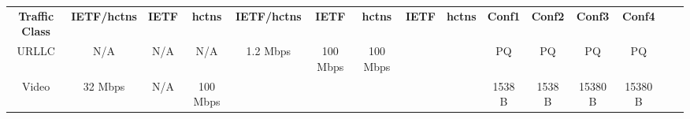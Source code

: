 \begin{table*}
{\begin{tabular}{cclccclccccccccll}
\multicolumn{1}{|c|}{\multirow{-3}{*}{\cellcolor[HTML]{FFFFFF}\textbf{Traffic Class}}} & \multicolumn{2}{c|}{\cellcolor[HTML]{FFFFFF}\textbf{IETF/\gls{hctns}}} & \multicolumn{1}{c|}{\cellcolor[HTML]{FFFFFF}\textbf{IETF}} & \multicolumn{1}{c|}{\cellcolor[HTML]{FFFFFF}\textbf{\gls{hctns}}} & \multicolumn{2}{c|}{\cellcolor[HTML]{FFFFFF}\textbf{IETF/\gls{hctns}}}      & \multicolumn{1}{c|}{\cellcolor[HTML]{FFFFFF}\textbf{IETF}}              & \multicolumn{1}{c|}{\cellcolor[HTML]{FFFFFF}\textbf{\gls{hctns}}}          & \multicolumn{1}{c|}{\cellcolor[HTML]{FFFFFF}\textbf{IETF}}         & \multicolumn{1}{c|}{\cellcolor[HTML]{FFFFFF}\textbf{\gls{hctns}}}          & \multicolumn{1}{c|}{\cellcolor[HTML]{FFFFFF}\textbf{Conf1}}          & \multicolumn{1}{c|}{\cellcolor[HTML]{FFFFFF}\textbf{Conf2}}           & \multicolumn{1}{c|}{\cellcolor[HTML]{FFFFFF}\textbf{Conf3}}          & \multicolumn{1}{c|}{\cellcolor[HTML]{FFFFFF}\textbf{Conf4}}           &  &  \\ \cline{1-15}
\multicolumn{1}{|c|}{\cellcolor[HTML]{FFFFFF}URLLC}                                    & \multicolumn{2}{c|}{\cellcolor[HTML]{FFFFFF}N/A}                    & \multicolumn{1}{c|}{\cellcolor[HTML]{FFFFFF}N/A}           & \multicolumn{1}{c|}{\cellcolor[HTML]{FFFFFF}N/A}               & \multicolumn{2}{c|}{\cellcolor[HTML]{FFFFFF}1.2 Mbps}                    & \multicolumn{1}{c|}{\cellcolor[HTML]{FFFFFF}100 Mbps}                   & \multicolumn{1}{c|}{\cellcolor[HTML]{FFFFFF}100 Mbps}                   & \multicolumn{1}{c|}{\cellcolor[HTML]{FFFFFF}}                      & \multicolumn{1}{c|}{\cellcolor[HTML]{FFFFFF}}                           & \multicolumn{1}{c|}{\cellcolor[HTML]{FFFFFF}PQ}                     & \multicolumn{1}{c|}{\cellcolor[HTML]{FFFFFF}PQ}                      & \multicolumn{1}{c|}{\cellcolor[HTML]{FFFFFF}PQ}                     & \multicolumn{1}{c|}{\cellcolor[HTML]{FFFFFF}PQ}                      &  &  \\ \cline{1-9} \cline{12-15}
\multicolumn{1}{|c|}{\cellcolor[HTML]{FFFFFF}Video}                                    & \multicolumn{2}{c|}{\cellcolor[HTML]{FFFFFF}32 Mbps}                & \multicolumn{1}{c|}{\cellcolor[HTML]{FFFFFF}N/A}           & \multicolumn{1}{c|}{\cellcolor[HTML]{FFFFFF}100 Mbps}          & \multicolumn{2}{c|}{\cellcolor[HTML]{FFFFFF}}                            & \multicolumn{1}{c|}{\cellcolor[HTML]{FFFFFF}}                           & \multicolumn{1}{c|}{\cellcolor[HTML]{FFFFFF}}                           & \multicolumn{1}{c|}{\cellcolor[HTML]{FFFFFF}}                      & \multicolumn{1}{c|}{\cellcolor[HTML]{FFFFFF}}                           & \multicolumn{1}{c|}{\cellcolor[HTML]{FFFFFF}1538 B}                   & \multicolumn{1}{c|}{\cellcolor[HTML]{FFFFFF}1538 B}                    & \multicolumn{1}{c|}{\cellcolor[HTML]{FFFFFF}15380 B}                  & \multicolumn{1}{c|}{\cellcolor[HTML]{FFFFFF}15380 B}                   &  &  \\ \cline{1-5} \cline{12-15}

\end{tabular}}
\end{table*}
